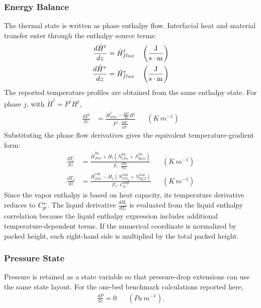             \subsubsection{Energy Balance}\label{subsubsec:energy-balance}
                The thermal state is written as phase enthalpy flow. Interfacial heat and material transfer enter through the enthalpy source terms:
                \begin{align}
                    \frac{d \dot{H}^{\liq}}{d z} &= \dot{H}^{\liq}_{flux} && \left(\frac{\unit{J}}{\unit{s\cdot m}} \right)\\
                    \frac{d \dot{H}^{\vap}}{d z} &= \dot{H}^{\vap}_{flux} && \left(\frac{\unit{J}}{\unit{s\cdot m}} \right)
                \end{align}
                The reported temperature profiles are obtained from the same enthalpy state. For phase $j$, with $\dot{H}^{j}=F^{j}H^{j}$,
                \begin{align}
                    \frac{dT^j}{dz} &= \frac{\dot{H}^{j}_{flux} - \frac{dF^j}{dz} H^j}{F^j \cdot \frac{dH^j}{dT^j}}
                    && \left(\unit{K\,m^{-1}}\right)
                \end{align}
                Substituting the phase flow derivatives gives the equivalent temperature-gradient form:
                \begin{align}
                    \frac{dT_l}{dz} &= \frac{\dot{H}^{\mathrm{liq}}_{flux} +  H_l(N^{\mathrm{liq}}_{\mathrm{CO}_2} + N^{\mathrm{liq}}_{\mathrm{H}_2\mathrm{O}})}{F_l \cdot \frac{dH_l}{dT_l}}
                    && \left(\unit{K\,m^{-1}}\right)\\[1em]
                    \frac{dT_v}{dz} &= \frac{\dot{H}^{\mathrm{vap}}_{flux} -  H_v(N^{\mathrm{vap}}_{\mathrm{CO}_2} + N^{\mathrm{vap}}_{\mathrm{H}_2\mathrm{O}})}{F_v \cdot C^{\mathrm{vap}}_{p}}
                    && \left(\unit{K\,m^{-1}}\right)
                \end{align}
                Since the vapor enthalpy is based on heat capacity, its temperature derivative reduces to $C_p^{v}$. The liquid derivative $\frac{dH_l}{dT_l}$ is evaluated from the liquid enthalpy correlation because the liquid enthalpy expression includes additional temperature-dependent terms. If the numerical coordinate is normalized by packed height, each right-hand side is multiplied by the total packed height.

            \subsubsection{Pressure State}
                Pressure is retained as a state variable so that pressure-drop extensions can use the same state layout. For the one-bed benchmark calculations reported here,
                \begin{align}
                    \frac{dP}{dz} = 0
                    && \left(\unit{Pa\,m^{-1}}\right).
                \end{align}

